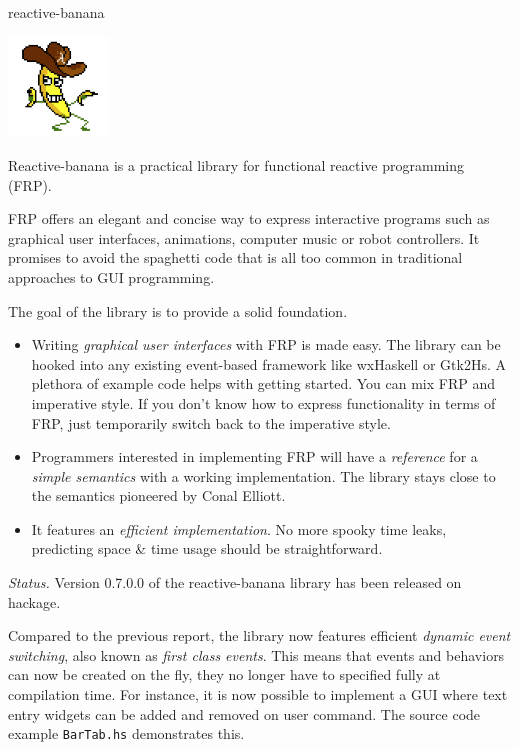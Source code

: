 \begin{hcarentry}[updated]{reactive-banana}
\makeheader

\begin{center}
\includegraphics[width=0.2\textwidth]{html/banana.jpg}
\end{center}

Reactive-banana is a practical library for functional reactive programming (FRP).

FRP offers an elegant and concise way to express interactive programs such as graphical user interfaces, animations, computer music or robot controllers. It promises to avoid the spaghetti code that is all too common in traditional approaches to GUI programming.

The goal of the library is to provide a solid foundation.
\begin{itemize}
\item Writing \emph{graphical user interfaces} with FRP is made easy. The library can be hooked into any existing event-based framework like wxHaskell or Gtk2Hs. A plethora of example code helps with getting started. You can mix FRP and imperative style. If you don't know how to express functionality in terms of FRP, just temporarily switch back to the imperative style.
\item Programmers interested in implementing FRP will have a \emph{reference} for a \emph{simple semantics} with a working implementation. The library stays close to the semantics pioneered by Conal Elliott.
\item It features an \emph{efficient implementation}. No more spooky time leaks, predicting space \& time usage should be straightforward.
\end{itemize}

\emph{Status.} Version 0.7.0.0 of the reactive-banana library has been released on hackage.

Compared to the previous report, the library now features efficient \emph{dynamic event switching}, also known as \emph{first class events}. This means that events and behaviors can now be created on the fly, they no longer have to specified fully at compilation time. For instance, it is now possible to implement a GUI where text entry widgets can be added and removed on user command. The source code example \verb!BarTab.hs! demonstrates this.


\end{hcarentry}
